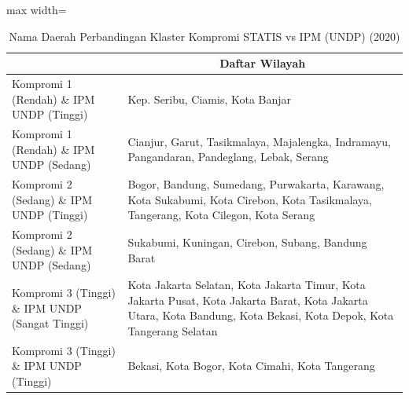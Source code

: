 \begin{table}[H]
\centering
\caption{Nama Daerah Perbandingan Klaster Kompromi STATIS vs IPM (UNDP) (2020)} \label{tab:app2comp_ipm_name_2020}
\begin{adjustbox}{max width=\textwidth}
\begin{tabular}{|>{\centering\arraybackslash}p{4cm}|p{10cm}|}
\hline
\multicolumn{1}{|c|}{\textbf{Kategori}} & \multicolumn{1}{c|}{\textbf{Daftar Wilayah}} \\
\hline
Kompromi 1 (Rendah) \& IPM UNDP (Tinggi) & Kep. Seribu, Ciamis, Kota Banjar \\
\hline
Kompromi 1 (Rendah) \& IPM UNDP (Sedang) & Cianjur, Garut, Tasikmalaya, Majalengka, Indramayu, Pangandaran, Pandeglang, Lebak, Serang \\
\hline
Kompromi 2 (Sedang) \& IPM UNDP (Tinggi) & Bogor, Bandung, Sumedang, Purwakarta, Karawang, Kota Sukabumi, Kota Cirebon, Kota Tasikmalaya, Tangerang, Kota Cilegon, Kota Serang \\
\hline
Kompromi 2 (Sedang) \& IPM UNDP (Sedang) & Sukabumi, Kuningan, Cirebon, Subang, Bandung Barat \\
\hline
Kompromi 3 (Tinggi) \& IPM UNDP (Sangat Tinggi) & Kota Jakarta Selatan, Kota Jakarta Timur, Kota Jakarta Pusat, Kota Jakarta Barat, Kota Jakarta Utara, Kota Bandung, Kota Bekasi, Kota Depok, Kota Tangerang Selatan \\
\hline
Kompromi 3 (Tinggi) \& IPM UNDP (Tinggi) & Bekasi, Kota Bogor, Kota Cimahi, Kota Tangerang \\
\hline
\end{tabular}
\end{adjustbox}
\end{table}